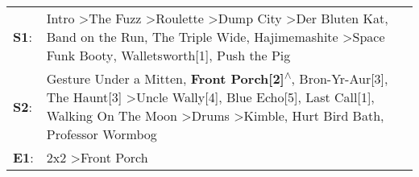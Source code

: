 \begin{supertabular}{p{0.03\textwidth}p{0.92\textwidth}}
 \textbf{S1}:  &                                                       Intro\textsuperscript{} \textgreater \enspace The Fuzz\textsuperscript{} \textgreater \enspace Roulette\textsuperscript{} \textgreater \enspace Dump City\textsuperscript{} \textgreater \enspace Der Bluten Kat\textsuperscript{}, \enspace Band on the Run\textsuperscript{}, \enspace The Triple Wide\textsuperscript{}, \enspace Hajimemashite\textsuperscript{} \textgreater \enspace Space Funk Booty\textsuperscript{}, \enspace Walletsworth[1]\textsuperscript{}, \enspace Push the Pig\textsuperscript{}  \enspace  \\
 \textbf{S2}:  &  Gesture Under a Mitten\textsuperscript{}, \enspace \textbf{Front Porch[2]\textsuperscript{$\wedge$}}, \enspace Bron-Yr-Aur[3]\textsuperscript{}, \enspace The Haunt[3]\textsuperscript{} \textgreater \enspace Uncle Wally[4]\textsuperscript{}, \enspace Blue Echo[5]\textsuperscript{}, \enspace Last Call[1]\textsuperscript{}, \enspace Walking On The Moon\textsuperscript{} \textgreater \enspace Drums\textsuperscript{} \textgreater \enspace Kimble\textsuperscript{}, \enspace Hurt Bird Bath\textsuperscript{}, \enspace Professor Wormbog\textsuperscript{}  \enspace  \\
 \textbf{E1}:  &                                                                                                                                                                                                                                                                                                                                                                                                                                                                                                2x2\textsuperscript{} \textgreater \enspace Front Porch\textsuperscript{}  \enspace  \\
\end{supertabular}
